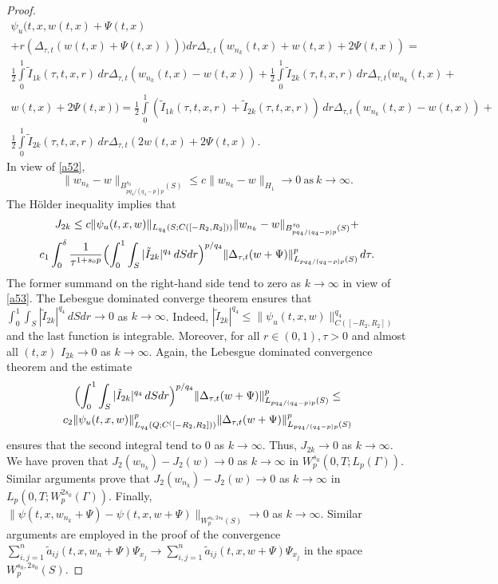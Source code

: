 \documentclass{article}
\theoremstyle{plain}
\begin{document}
\begin{proof}
\begin{multline*}
\psi_u(t,x, w(t,x)+\Psi(t,x) \\ + r(\Delta_{\tau,t}(w(t,x)+  \Psi(t,x)))) dr   \Delta_{\tau,t}(w_{n_k}(t,x)+w(t,x)+ 2\Psi(t,x))=\\
\frac{1}{2}\int\limits_0^1  \tilde{I}_{1k}(\tau,t,x,r)\,dr     \Delta_{\tau,t}(w_{n_k}(t,x)-w(t,x)) +  
 \frac{1}{2}\int\limits_0^1  \tilde{I}_{2k}(\tau,t,x,r)\,dr      \Delta_{\tau,t}(w_{n_k}(t,x)+\\ w(t,x)+ 2\Psi(t,x))  =
 \frac{1}{2}\int\limits_0^1  (\tilde{I}_{1k}(\tau,t,x,r)+\tilde{I}_{2k}(\tau,t,x,r))\,dr     \Delta_{\tau,t}(w_{n_k}(t,x)-w(t,x)) +  \\
 \frac{1}{2}\int\limits_0^1  \tilde{I}_{2k}(\tau,t,x,r)\,dr     \Delta_{\tau,t}(2w(t,x)+ 2\Psi(t,x)).
 \end{multline*}
In view of  \eqref{a52}, 
\begin{equation}\label{a53}
\|w_{n_k}-w\|_{B_{pq_4/(q_4-p) p}^{s_0}(S)}\leq c \|w_{n_k}-w\|_{H_1} \to 0\ \textrm{as}\  k\to \infty. 
\end{equation}
The H\"{o}lder inequality  implies that 
\begin{multline*}
J_{2k}\leq c \|\psi_u (t,x,w)\|_{L_{q_4}(S;C([-R_2,R_2]))}\|w_{n_k}-w\|_{B_{pq_4/(q_4-p) p}^{s_0}(S)}+  \\
c_1\int_0^\delta \frac{1}{\tau^{1+s_0p}}\Bigl( \int_0^1\int_S |\tilde{I}_{2k}|^{q_4}\,dSdr\Bigr)^{p/q_4}  \|\Delta_{\tau,t}(w+\Psi)\|_{L_{pq_4/(q_4-p) p}(S)}^p\,d\tau.
\end{multline*} 
The former summand on the right-hand side tend to zero as $k\to \infty$  in view of \eqref{a53}. 
 The Lebesgue dominated converge theorem ensures that  $ \int_0^1\int_S |\tilde{I}_{2k}|^{q_4}\,dSdr\to 0$ as $k\to \infty$. Indeed,  $|\tilde{I}_{2k}|^{q_4}\leq 
\|\psi_u (t,x,w)\|^{q_4}_{C([-R_2,R_2])}$ and the last function is integrable. Moreover, for all $r\in (0,1), \tau>0$ and almost all  $(t,x)$ $I_{2k}\to 0 $ as $k\to \infty$. 
Again, the Lebesgue dominated convergence theorem and the estimate 
\begin{multline*}
\Bigl( \int_0^1\int_S |\tilde{I}_{2k}|^{q_4}\,dSdr\Bigr)^{p/q_4}  \|\Delta_{\tau,t}(w+\Psi)\|_{L_{pq_4/(q_4-p) p}(S)}^p\leq \\ c_2 \|\psi_u (t,x,w)\|_{L_{q_4}(Q;C^([-R_2,R_2]))}^{p}
 \|\Delta_{\tau,t}(w+\Psi)\|_{L_{pq_4/(q_4-p) p}(S)}^p
\end{multline*} 
ensures that the second integral tend to 0 as  $k\to \infty$. Thus,  $J_{2k}\to 0$ as $k\to \infty$. 
We have proven that  $J_2(w_{n_k})-J_2(w)\to 0$ as $k\to \infty$ in $W_p^{s_0}(0,T;L_p(\Gamma))$.
Similar arguments prove that  $J_2(w_{n_k})-J_2(w)\to 0$ as $k\to \infty$ in $L_p(0,T;W_p^{2s_0}(\Gamma))$.
Finally,  $\|\psi(t,x,w_{n_k}+\Psi)  - \psi(t,x,w+\Psi)\|_{W_p^{s_0,2s_0}(S)}\to 0$ as $k\to \infty$. 
Similar arguments are employed in the proof of the convergence 
$\sum_{i,j=1}^n  \tilde{a}_{ij}(t,x,w_n+\Psi) \Psi_{x_j}\to \sum_{i,j=1}^n  \tilde{a}_{ij}(t,x,w+\Psi) \Psi_{x_j}$ in the space $W_p^{s_0,2s_0}(S)$.


\end{proof}
\end{document}
